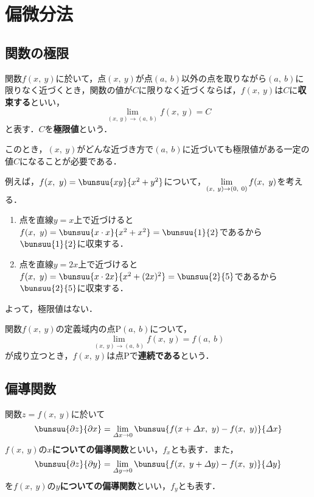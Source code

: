 \chapter{偏微分法}
\setcounter{page}{1}
\section{関数の極限}

関数$f(x,\ y)$に於いて，点$(x,\ y)$が点$(a,\ b)$以外の点を取りながら$(a,\ b)$に限りなく近づくとき，関数の値が$C$に限りなく近づくならば，$f(x,\ y)$は$C$に\textbf{収束する}といい，
\begin{equation}
	\lim_{(x,\ y) \to (a,\ b)} f(x,\ y) = C
\end{equation}
と表す．$C$を\textbf{極限値}という．

このとき，$(x,\ y)$がどんな近づき方で$(a,\ b)$に近づいても極限値がある一定の値$C$になることが必要である．

例えば，$f(x,\ y) = \bunsuu{xy}{x^2 + y^2}$について，$\dlim_{(x,\ y) \to (0,\ 0)} f(x,\ y)$を考える．
\begin{enumerate}[label=(\roman*), labelsep=10pt, leftmargin=23pt]
	\item 点を直線$y = x$上で近づけると$f(x,\ y) = \bunsuu{x \cdot x}{x^2 + x^2} = \bunsuu{1}{2}$であるから$\bunsuu{1}{2}$に収束する．
	\item 点を直線$y = 2x$上で近づけると$f(x,\ y) = \bunsuu{x \cdot 2x}{x^2 + (2x)^2} = \bunsuu{2}{5}$であるから$\bunsuu{2}{5}$に収束する．
\end{enumerate}
よって，極限値はない．

関数$f(x,\ y)$の定義域内の点$\mathrm{P}(a,\ b)$について，
\begin{equation}
	\lim_{(x,\ y) \to (a,\ b)} f(x,\ y) = f(a,\ b)
\end{equation}
が成り立つとき，$f(x,\ y)$は点$\mathrm{P}$で\textbf{連続である}という．


\section{偏導関数}

関数$z = f(x,\ y)$に於いて
\begin{equation}
	\bunsuu{\partial z}{\partial x} = \lim_{\varDelta x \to 0} \bunsuu{f(x + \varDelta x,\ y) - f(x,\ y)}{\varDelta x}
\end{equation}
$f(x,\ y)$の\textbf{$x$についての偏導関数}といい，$f_x$とも表す．また，
\begin{equation}
	\bunsuu{\partial z}{\partial y} = \lim_{\varDelta y \to 0} \bunsuu{f(x,\ y + \varDelta y) - f(x,\ y)}{\varDelta y}
\end{equation}
を$f(x,\ y)$の\textbf{$y$についての偏導関数}といい，$f_y$とも表す．

